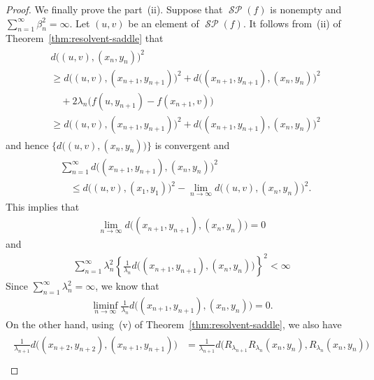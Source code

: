 \documentclass[draft]{amsart}
\numberwithin{equation}{section}
\DeclareMathOperator{\Saddle}{\mathcal{SP}}
\theoremstyle{plain}
\theoremstyle{definition}
\theoremstyle{remark}
\begin{document}
\begin{proof}
 We finally prove the part~(ii). 
 Suppose that 
 $\Saddle (f)$ is nonempty 
 and $\sum_{n=1}^{\infty}\beta_n^2=\infty$. 
 Let $(u,v)$ 
 be an element of $\Saddle (f)$. 
 It follows from~(ii) of Theorem~\ref{thm:resolvent-saddle} that 
 \begin{align}
  \begin{split}
  &d\bigl((u,v),(x_{n},y_{n})\bigr)^2 \\
  &\geq d\bigl((u,v),(x_{n+1},y_{n+1})\bigr)^2 
  + d\bigl((x_{n+1},y_{n+1}),(x_{n},y_{n})\bigr)^2 \\
  &\quad +2\lambda_n 
  \bigl(
  f(u,y_{n+1}) -f(x_{n+1},v)
  \bigr) \\
  &\geq d\bigl((u,v),(x_{n+1},y_{n+1})\bigr)^2 
  + d\bigl((x_{n+1},y_{n+1}),(x_{n},y_{n})\bigr)^2 
  \end{split}
 \end{align}
 and hence $\{d\bigl((u,v),(x_{n},y_{n})\bigr)\}$ 
 is convergent and 
 \begin{align}
  \begin{split}
  &\sum_{n=1}^{\infty} d\bigl((x_{n+1},y_{n+1}),(x_{n},y_{n})\bigr)^2 \\
  &\quad \leq d\bigl((u,v),(x_{1},y_{1})\bigr)^2 
 -\lim_{n\to \infty} d\bigl((u,v),(x_{n},y_{n})\bigr)^2. 
  \end{split}
 \end{align}
 This implies that 
 \begin{align}\label{eq:thm:PPA-Saddle-a0}
  \lim_{n\to \infty}d\bigl((x_{n+1},y_{n+1}),(x_{n},y_{n})\bigr)= 0 
 \end{align}
 and 
 \begin{align}\label{eq:thm:PPA-Saddle-a1}
 \sum_{n=1}^{\infty} 
  \lambda_n^2 \left\{
\frac{1}{\lambda_n} d\bigl((x_{n+1},y_{n+1}),(x_{n},y_{n})\bigr) 
  \right\}^2
  <\infty
 \end{align}
 Since $\sum_{n=1}^{\infty}\lambda_n^2=\infty$, we know that 
 \begin{align}
  \liminf_{n\to \infty} 
\frac{1}{\lambda_n} d\bigl((x_{n+1},y_{n+1}),(x_{n},y_{n})\bigr) 
 =0. 
 \end{align} 
 On the other hand, using~(v) of Theorem~\ref{thm:resolvent-saddle}, 
 we also have 
 \begin{align}
 \begin{split}
  \frac{1}{\lambda_{n+1}} 
  d\bigl((x_{n+2},y_{n+2}),(x_{n+1},y_{n+1})\bigr)
 &=\frac{1}{\lambda_{n+1}} 
  d\bigl(R_{\lambda_{n+1}}R_{\lambda_n}(x_{n},y_{n}),
  R_{\lambda_n}(x_{n},y_{n})\bigr) \\

\end{split}
\end{align}
\end{proof}
\end{document}
